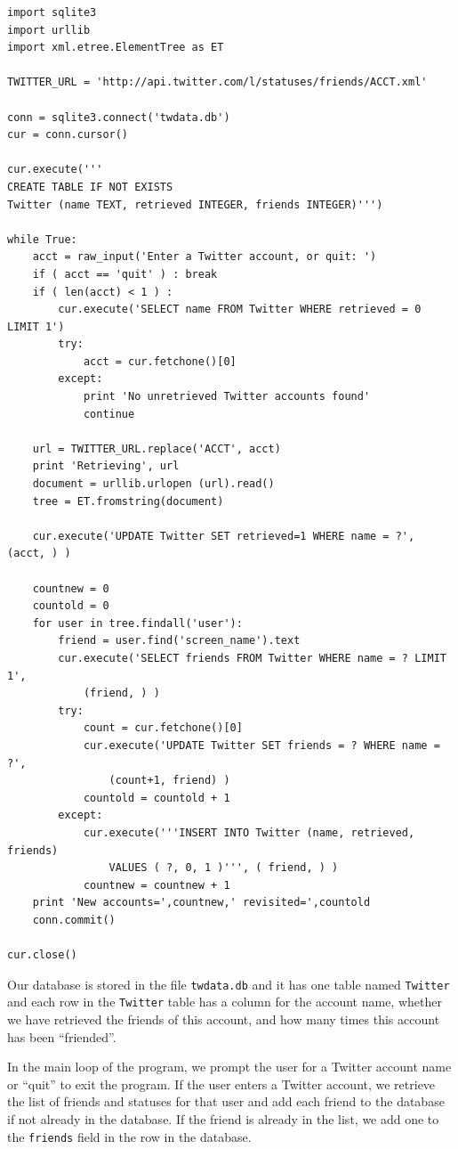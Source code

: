 \documentclass[11pt]{book}
\begin{document}
\beforeverb
\begin{verbatim}
import sqlite3
import urllib
import xml.etree.ElementTree as ET

TWITTER_URL = 'http://api.twitter.com/l/statuses/friends/ACCT.xml'

conn = sqlite3.connect('twdata.db')
cur = conn.cursor()

cur.execute('''
CREATE TABLE IF NOT EXISTS 
Twitter (name TEXT, retrieved INTEGER, friends INTEGER)''')

while True:
    acct = raw_input('Enter a Twitter account, or quit: ')
    if ( acct == 'quit' ) : break
    if ( len(acct) < 1 ) :
        cur.execute('SELECT name FROM Twitter WHERE retrieved = 0 LIMIT 1')
        try:
            acct = cur.fetchone()[0]
        except:
            print 'No unretrieved Twitter accounts found'
            continue

    url = TWITTER_URL.replace('ACCT', acct)
    print 'Retrieving', url
    document = urllib.urlopen (url).read()
    tree = ET.fromstring(document)

    cur.execute('UPDATE Twitter SET retrieved=1 WHERE name = ?', (acct, ) )

    countnew = 0
    countold = 0
    for user in tree.findall('user'):
        friend = user.find('screen_name').text
        cur.execute('SELECT friends FROM Twitter WHERE name = ? LIMIT 1', 
            (friend, ) )
        try:
            count = cur.fetchone()[0]
            cur.execute('UPDATE Twitter SET friends = ? WHERE name = ?', 
                (count+1, friend) )
            countold = countold + 1
        except:
            cur.execute('''INSERT INTO Twitter (name, retrieved, friends) 
                VALUES ( ?, 0, 1 )''', ( friend, ) )
            countnew = countnew + 1
    print 'New accounts=',countnew,' revisited=',countold
    conn.commit()

cur.close()
\end{verbatim}
\afterverb
%
Our database is stored in the file {\tt twdata.db} and it has one 
table named {\tt Twitter} and each row in the {\tt Twitter} table
has a column for the account name, whether we have retrieved the friends
of this account, and how many times this account has been ``friended''.

In the main loop of the program, we prompt the user for a Twitter
account name or ``quit'' to exit the program.  
If the user enters a Twitter account, we retrieve the 
list of friends and statuses
for that user and add each friend to the database if 
not already in the database.  If the friend is already in the list, 
we add one to the {\tt friends} field in the row in the database.
\end{document}
